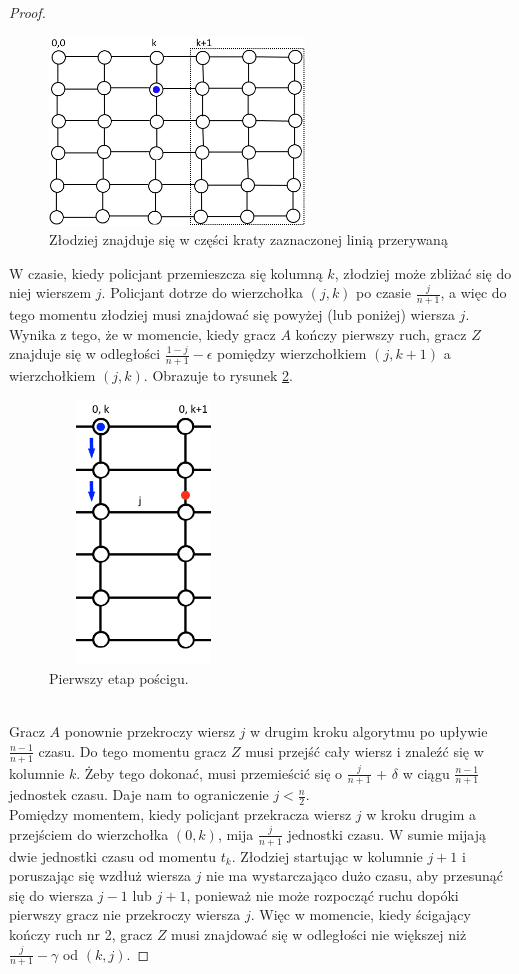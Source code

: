 \documentclass[brudnopis]{xmgr}
\theoremstyle{definition}
\begin{document}
\begin{proof}
	\begin{figure}[ht!]
	  \centering
	  \includegraphics[height=5cm]{rysunki/podsiatka.png}
	  \caption{Złodziej znajduje się w części kraty zaznaczonej linią przerywaną}
    \label{fig:miejsceucieczki}
	\end{figure} 

	\indent W czasie, kiedy policjant przemieszcza się kolumną $k$, złodziej może zbliżać się do niej wierszem $j$. Policjant dotrze do wierzchołka $(j,k)$ po czasie $\frac{j}{n+1}$, a więc do tego momentu złodziej musi znajdować się powyżej (lub poniżej) wiersza $j$. Wynika z tego, że w momencie, kiedy gracz $A$ kończy pierwszy ruch, gracz $Z$ znajduje się w odległości $\frac{1-j}{n+1} - \epsilon$ pomiędzy wierzchołkiem $(j,k + 1)$ a wierzchołkiem $(j,k)$. Obrazuje to rysunek \ref{fig:pierwszy krok}.
	\begin{figure}[ht!]
	  \centering
	  \includegraphics[width=5cm,height=7cm]{rysunki/poscig_1.png}
	  \caption{Pierwszy etap pościgu.}
	  \label{fig:pierwszy krok}
	\end{figure}
	\\\indent Gracz $A$ ponownie przekroczy wiersz $j$ w drugim kroku algorytmu po upływie $\frac{n-1}{n+1}$ czasu. Do tego momentu gracz $Z$ musi przejść cały wiersz i znaleźć się w kolumnie $k$. Żeby tego dokonać, musi przemieścić się o $\frac{j}{n+1}$ + $\delta$ w ciągu $\frac{n-1}{n+1}$ jednostek czasu. Daje nam to ograniczenie $j < \frac{n}{2}$.
	\\\indent Pomiędzy momentem, kiedy policjant przekracza wiersz $j$ w kroku drugim a przejściem do wierzchołka $(0,k)$, mija $\frac{j}{n+1}$ jednostki czasu. W sumie mijają dwie jednostki czasu od momentu $t_k$. Złodziej startując w kolumnie $j + 1$ i poruszając się wzdłuż wiersza $j$ nie ma wystarczająco dużo czasu, aby przesunąć się do wiersza $j - 1$ lub $j + 1$, ponieważ nie może rozpocząć ruchu dopóki pierwszy gracz nie przekroczy wiersza $j$. Więc w momencie, kiedy ścigający kończy ruch nr 2, gracz $Z$ musi znajdować się w odległości nie większej niż $\frac{j}{n+1} - \gamma$ od $(k,j)$. 


\end{proof}
\end{document}
